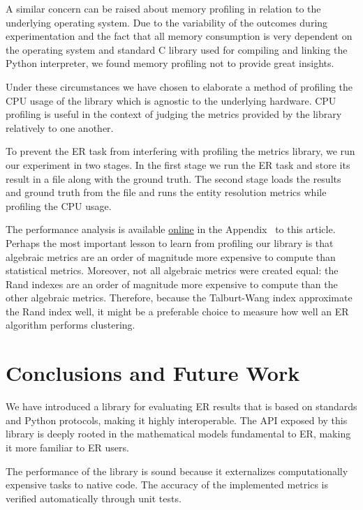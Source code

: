 \documentclass[a4paper,twoside]{article}
\newcommand{\appendixurl}{https://matchescu.github.io/py-resolve-metrics/article/02_appendix.pdf}
\begin{document}
    A similar concern can be raised about memory profiling in relation to the
    underlying operating system.
    Due to the variability of the outcomes during experimentation and the fact
    that all memory consumption is very dependent on the operating system and
    standard C library used for compiling and linking the Python interpreter,
    we found memory profiling not to provide great insights.

    Under these circumstances we have chosen to elaborate a method of profiling
    the CPU usage of the library which is agnostic to the underlying hardware.
    CPU profiling is useful in the context of judging the metrics provided by
    the library relatively to one another.

    To prevent the ER task from interfering with profiling the metrics library,
    we run our experiment in two stages.
    In the first stage we run the ER task and store its result in a file along
    with the ground truth.
    The second stage loads the results and ground truth from the file and runs
    the entity resolution metrics while profiling the CPU usage.

    The performance analysis is available \href{\appendixurl}{online} in the
    Appendix~\cite{appendix2024} to this article.
    Perhaps the most important lesson to learn from profiling our library is
    that algebraic metrics are an order of magnitude more expensive to compute
    than statistical metrics.
    Moreover, not all algebraic metrics were created equal: the Rand indexes
    are an order of magnitude more expensive to compute than the other algebraic
    metrics.
    Therefore, because the Talburt-Wang index approximate the Rand index well,
    it might be a preferable choice to measure how well an ER algorithm performs
    clustering.

    \section{Conclusions and Future Work}\label{sec:conclusions_and_future}

    We have introduced a library for evaluating ER results that
    is based on standards and Python protocols, making it highly interoperable.
    The API exposed by this library is deeply rooted in the mathematical models
    fundamental to ER, making it more familiar to ER users.

    The performance of the library is sound because it externalizes
    computationally expensive tasks to native code.
    The accuracy of the implemented metrics is verified automatically through
    unit tests.
\end{document}
